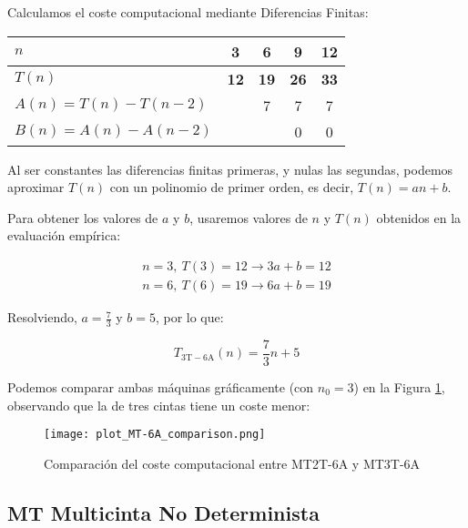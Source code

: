 Calculamos el coste computacional mediante Diferencias Finitas:

\begin{table}[H]
    \centering
    \begin{tabular}{|l|c|c|c|c|}
        \hline
        $n$    & \textbf{3}  & \textbf{6}  & \textbf{9}  & \textbf{12} \\ \hline
        $T(n)$ & \textbf{12} & \textbf{19} & \textbf{26} & \textbf{33} \\ \hline
        \hline
        $A(n) = T(n) - T(n-2)$ &   & 7 & 7 & 7 \\ \hline
        $B(n) = A(n) - A(n-2)$ &   &   & 0 & 0 \\ \hline
    \end{tabular}
\end{table}

Al ser constantes las diferencias finitas primeras, y nulas las segundas, podemos aproximar $T(n)$ con un polinomio de primer orden, es decir, $T(n) = an + b$.\medskip

Para obtener los valores de $a$ y $b$, usaremos valores de $n$ y $T(n)$ obtenidos en la evaluación empírica:

\begin{subequations}
    \begin{gather}
        n = 3,\ T(3) = 12 \rightarrow 3a + b = 12 \\
        n = 6,\ T(6) = 19 \rightarrow 6a + b = 19
    \end{gather}
\end{subequations}

Resolviendo, $a=\frac{7}{3}$ y $b=5$, por lo que:

\begin{equation}
    T_{\mathrm{3T-6A}}(n) = \frac{7}{3}n + 5
\end{equation}

Podemos comparar ambas máquinas gráficamente (con $n_0 = 3$) en la Figura \ref{fig:MT-6A}, observando que la de tres cintas tiene un coste menor:

\begin{figure}[H]
    \centering
    \texttt{[image: plot\_MT-6A\_comparison.png]}
    \caption{Comparación del coste computacional entre MT2T-6A y MT3T-6A}
    \label{fig:MT-6A}
\end{figure}




\subsection{MT Multicinta No Determinista}

